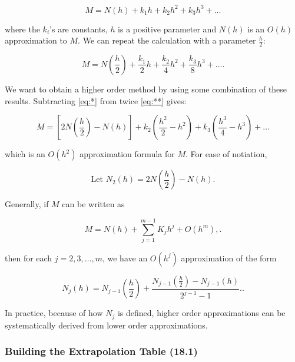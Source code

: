 \documentclass[12pt]{article}
\begin{document}
\begin{equation}
M = N(h) + k_1h + k_2h^2 + k_3h^3 + \dots
\label{eq:*}
\end{equation}

\noindent where the $k_i$'s are constants, $h$ is a positive parameter and
$N(h)$ is an $O(h)$ approximation to $M$. We can repeat the calculation with a
parameter $\frac{h}{2}$:

\begin{equation}
M=N\left(\frac{h}{2}\right) + \frac{k_1}{2}h + \frac{k_2}{4}h^2 + \frac{k_3}{8}h^3 + \dots
\label{eq:**}
.\end{equation}

We want to obtain a higher order method by using some combination of these
results. 
Subtracting \eqref{eq:*} from twice \eqref{eq:**} gives:

\begin{equation}
  M = \left[2N\left(\frac{h}{2}\right) - N(h)\right] + k_2\left(\frac{h^2}{2} 
  - h^2\right) + k_3 \left(\frac{h^3}{4}-h^3\right) + \dots
  \label{eq:?}
\end{equation}

\noindent
which is an $O(h^2)$ approximation formula for $M$. For ease of notiation, 

\[
\text{Let } N_2(h) = 2N\left(\frac{h}{2}\right) - N(h)
.\]

\noindent
Generally, if $M$ can be written as

\[
  M = N(h) + \sum_{j=1}^{m-1} K_j h^j + O(h^m),
.\]

\noindent
then for each $j = 2, 3, \dots, m$, we have an $O(h^j)$ approximation of the form

\[
  N_j(h) = N_{j-1} \left(\frac{h}{2}\right) + \frac{N_{j-1} \left(\frac{h}{2}\right) - N_{j-1}(h)}{2^{j-1} - 1}.
.\]

In practice, because of how $N_j$ is defined, higher order approximations can 
be systematically derived from lower order approximations.

\subsubsection{Building the Extrapolation Table (18.1)}\label{sec:building_the_extrapolation_table}
\end{document}
